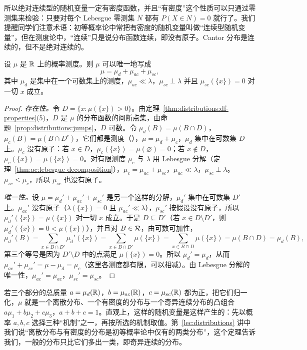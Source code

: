 所以绝对连续型的随机变量一定有密度函数，并且“有密度”这个性质可以只通过零测集来检验：只要对每个 Lebesgue 零测集 $N$ 都有 $P(X\in N)=0$ 就行了。我们提醒同学们注意术语：初等概率论中常把有密度的随机变量叫做“连续型随机变量”，但在测度论中，“连续”只是说分布函数连续，即没有原子。Cantor 分布是连续的，但不是绝对连续的。

\begin{theorem}[分布的分解]\label{thm:ac:decomposition-distributions}
设 $\mu$ 是 $\mathbb{R}$ 上的概率测度。则 $\mu$ 可以唯一地写成
\[
\mu=\mu_d+\mu_{ac}+\mu_{sc},
\]
其中 $\mu_d$ 是集中在一个可数集上的测度，$\mu_{ac}\ll\lambda$，$\mu_{sc}\perp\lambda$ 并且 $\mu_{sc}(\{x\})=0$ 对一切 $x$ 成立。
\end{theorem}
\begin{proof}
\emph{存在性。}令 $D=\{x:\mu(\{x\})>0\}$。由定理~\ref{thm:distributions:df-properties}(5)，$D$ 是 $\mu$ 的分布函数的间断点集，由命题~\ref{prop:distributions:jumps}，$D$ 可数。令 $\mu_d(B)=\mu(B\cap D)$，$\mu_c(B)=\mu(B\cap D^c)$，它们都是测度（），$\mu=\mu_d+\mu_c$，$\mu_d$ 集中在可数集 $D$ 上。$\mu_c$ 没有原子：若 $x\in D$，$\mu_c(\{x\})=\mu(\varnothing)=0$；若 $x\notin D$，$\mu_c(\{x\})=\mu(\{x\})=0$。对有限测度 $\mu_c$ 与 $\lambda$ 用 Lebesgue 分解（定理~\ref{thm:ac:lebesgue-decomposition}），$\mu_c=\mu_{ac}+\mu_{sc}$，$\mu_{ac}\ll\lambda$，$\mu_{sc}\perp\lambda$。$\mu_{sc}\leqslant\mu_c$，所以 $\mu_{sc}$ 也没有原子。

\emph{唯一性。}设 $\mu=\mu_d'+\mu_{ac}'+\mu_{sc}'$ 是另一个这样的分解，$\mu_d'$ 集中在可数集 $D'$ 上。$\mu_{ac}'$ 没有原子（$\lambda(\{x\})=0$ 且 $\mu_{ac}'\ll\lambda$），$\mu_{sc}'$ 按假设没有原子，所以 $\mu_d'(\{x\})=\mu(\{x\})$ 对一切 $x$ 成立。于是 $D\subseteq D'$（若 $x\in D\setminus D'$，则 $\mu_d'(\{x\})=0<\mu(\{x\})$），并且对 $B\in\mathcal{R}$，由可数可加性，
\[
\mu_d'(B)=\sum_{x\in B\cap D'}\mu_d'(\{x\})=\sum_{x\in B\cap D'}\mu(\{x\})=\sum_{x\in B\cap D}\mu(\{x\})=\mu(B\cap D)=\mu_d(B),
\]
第三个等号是因为 $D'\setminus D$ 中的点满足 $\mu(\{x\})=0$。所以 $\mu_d'=\mu_d$，从而 $\mu_{ac}'+\mu_{sc}'=\mu-\mu_d=\mu_c$（这里各测度都有限，可以相减）。由 Lebesgue 分解的唯一性，$\mu_{ac}'=\mu_{ac}$，$\mu_{sc}'=\mu_{sc}$。
\end{proof}

若三个部分的总质量 $a=\mu_d(\mathbb{R})$，$b=\mu_{ac}(\mathbb{R})$，$c=\mu_{sc}(\mathbb{R})$ 都为正，把它们归一化，$\mu$ 就是一个离散分布、一个有密度的分布与一个奇异连续分布的凸组合 $a\mu_1+b\mu_2+c\mu_3$，$a+b+c=1$。直观上，这样的随机变量是这样产生的：先以概率 $a,b,c$ 选择三种“机制”之一，再按所选的机制取值。第~\ref{lec:distributions} 讲中我们说“离散分布与有密度的分布是初等概率论中仅有的两类分布”，这个定理告诉我们，一般的分布只比它们多出一类，即奇异连续的分布。

